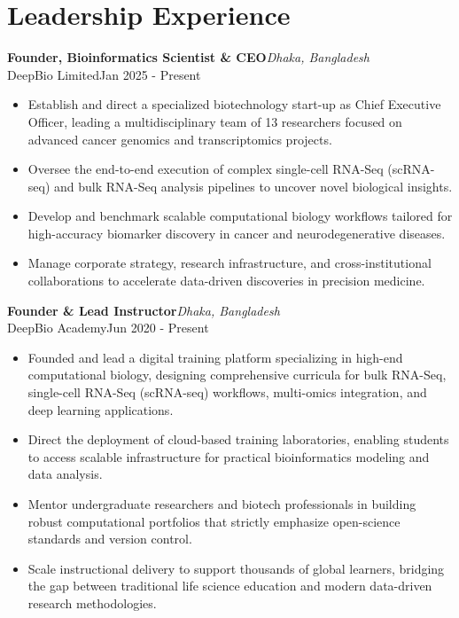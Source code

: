 \documentclass[
  11pt,
  letterpaper,
  DIV=11,
  numbers=noendperiod]{scrartcl}
\begin{document}
\section{Leadership Experience}\label{leadership-experience}

\noindent

\begin{minipage}{\linewidth}
\textbf{Founder, Bioinformatics Scientist \& CEO}\hfill \textit{Dhaka, Bangladesh}\\
DeepBio Limited\hfill Jan 2025 - Present
\end{minipage}
\begin{itemize}[nosep,topsep=2pt,leftmargin=1em]
  \item Establish and direct a specialized biotechnology start-up as Chief Executive Officer, leading a multidisciplinary team of 13 researchers focused on advanced cancer genomics and transcriptomics projects.
  \item Oversee the end-to-end execution of complex single-cell RNA-Seq (scRNA-seq) and bulk RNA-Seq analysis pipelines to uncover novel biological insights.
  \item Develop and benchmark scalable computational biology workflows tailored for high-accuracy biomarker discovery in cancer and neurodegenerative diseases.
  \item Manage corporate strategy, research infrastructure, and cross-institutional collaborations to accelerate data-driven discoveries in precision medicine.
\end{itemize}
\vspace{5pt}

\noindent

\begin{minipage}{\linewidth}
\textbf{Founder \& Lead Instructor}\hfill \textit{Dhaka, Bangladesh}\\
DeepBio Academy\hfill Jun 2020 - Present
\end{minipage}
\begin{itemize}[nosep,topsep=2pt,leftmargin=1em]
  \item Founded and lead a digital training platform specializing in high-end computational biology, designing comprehensive curricula for bulk RNA-Seq, single-cell RNA-Seq (scRNA-seq) workflows, multi-omics integration, and deep learning applications.
  \item Direct the deployment of cloud-based training laboratories, enabling students to access scalable infrastructure for practical bioinformatics modeling and data analysis.
  \item Mentor undergraduate researchers and biotech professionals in building robust computational portfolios that strictly emphasize open-science standards and version control.
  \item Scale instructional delivery to support thousands of global learners, bridging the gap between traditional life science education and modern data-driven research methodologies.
\end{itemize}
\vspace{5pt}
\end{document}
